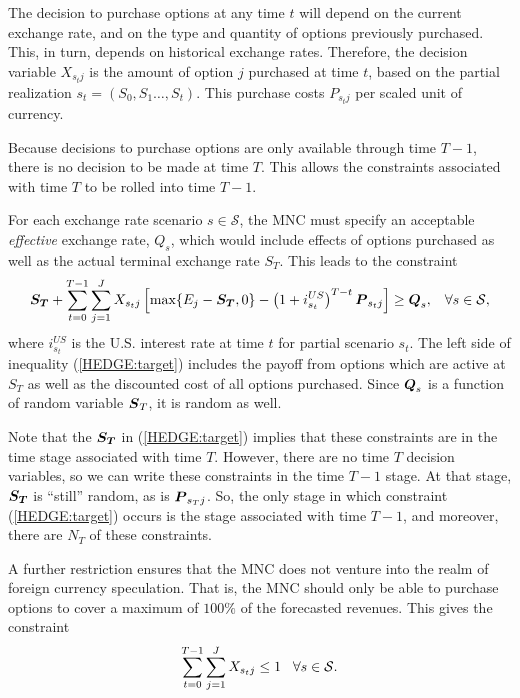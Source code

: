 The decision to purchase options at any time $t$ will depend on the current exchange rate, and on the type and quantity of options previously purchased.  This, in turn, depends on historical exchange rates.  Therefore, the decision variable $X_{s_t j}$ is the amount of option $j$ purchased at time $t$, based on the partial realization $s_t = (S_0,S_1 \ldots, S_t)$.  This purchase costs $P_{s_t j}$ per scaled unit of currency.

Because decisions to purchase options are only available through time $T-1$, there is no decision to be made at time $T$.  This allows the constraints associated with time $T$ to be rolled into time $T-1$.

For each exchange rate scenario $s \in \mathcal{S}$, the MNC must specify an acceptable \emph{effective} exchange rate, $Q_s$, which would include effects of options purchased as well as the actual terminal exchange rate $S_T$.  This leads to the constraint
\begin{equation}
\label{HEDGE:target}
\mathbf{\boldsymbol{S_T}} + \sum_{t=0}^{T-1} \sum_{j=1}^J X_{s_t j}\left[ \mbox{max}\{E_j - \mathbf{\boldsymbol{S_T}},0\} - \left(1+i^{US}_{s_t}\right)^{T-t}\mathbf{\boldsymbol{P}}_{s_t j}\right] \geq \mathbf{\boldsymbol{Q}}_s, \hspace{3mm} \forall s \in \mathcal{S},
\end{equation}
where $i^{US}_{s_t}$ is the U.S. interest rate at time $t$ for partial scenario $s_t$.  The left side of inequality (\ref{HEDGE:target}) includes the payoff from options which are active at $S_T$ as well as the discounted cost of all options purchased.  Since $\mathbf{\boldsymbol{Q}}_s$ is a function of random variable $\mathbf{\boldsymbol{S}}_T$, it is random as well.

Note that the $\mathbf{\boldsymbol{S_T}}$ in (\ref{HEDGE:target}) implies that these constraints are in the time stage associated with time $T$.  However, there are no time $T$ decision variables, so we can write these constraints in the time $T-1$ stage.  At that stage, $\mathbf{\boldsymbol{S_T}}$ is ``still'' random, as is $\mathbf{\boldsymbol{P}}_{s_T j}$.  So, the only stage in which constraint (\ref{HEDGE:target}) occurs is the stage associated with time $T-1$, and moreover, there are $N_T$ of these constraints.

A further restriction ensures that the MNC does not venture into the realm of foreign currency speculation.  That is, the MNC should only be able to purchase options to cover a maximum of $100\%$ of the forecasted revenues.  This gives the constraint
\begin{equation}
\label{HEDGE:speculate}
\sum_{t=0}^{T-1} \sum_{j=1}^{J} X_{s_t j} \leq 1 \hspace{3mm} \forall s \in \mathcal{S}.
\end{equation}


